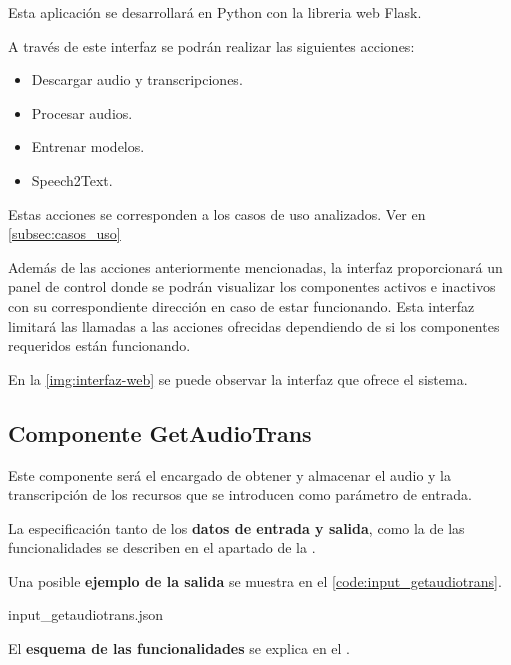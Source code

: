 \documentclass[../main.tex]{subfiles}
\begin{document}
Esta aplicación se desarrollará en Python con la libreria web Flask.

A través de este interfaz se podrán realizar las siguientes acciones:
\begin{itemize}
    \item Descargar audio y transcripciones.
    \item Procesar audios.
    \item Entrenar modelos.
    \item Speech2Text.
\end{itemize}

Estas acciones se corresponden a los casos de uso analizados. Ver en \autoref{subsec:casos_uso}

Además de las acciones anteriormente mencionadas, la interfaz proporcionará un panel de control donde se podrán visualizar los componentes activos e inactivos con su correspondiente dirección en caso de estar funcionando. Esta interfaz limitará las llamadas a las acciones ofrecidas dependiendo de si los componentes requeridos están funcionando.

En la \autoref{img:interfaz-web} se puede observar la interfaz que ofrece el sistema.


\subsection{Componente GetAudioTrans}\label{subsec:impl_getaudiotrans}
Este componente será el encargado de obtener y almacenar el audio y la transcripción de los recursos que se introducen como parámetro de entrada.

La especificación tanto de los \textbf{datos de entrada y salida}, como la de las funcionalidades se describen en el apartado  de la .

Una posible \textbf{ejemplo de la salida} se muestra en el \autoref{code:input_getaudiotrans}.

                {input_getaudiotrans.json}

El \textbf{esquema de las funcionalidades} se explica en el .
\end{document}
